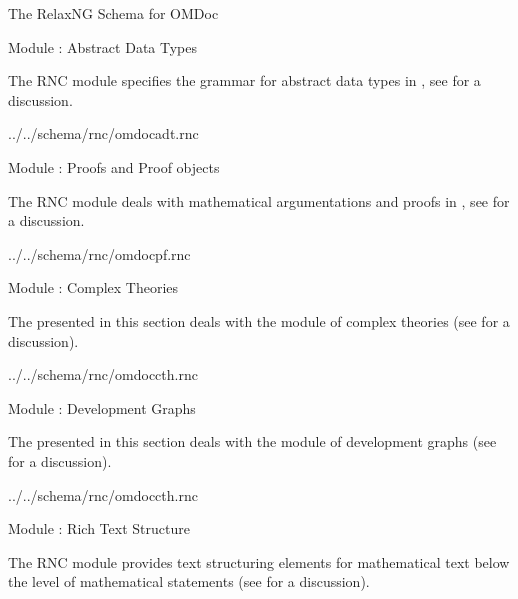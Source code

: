 \begin{tchapter}[id=rnc]{The RelaxNG Schema for OMDoc}
\begin{tsection}[id=rnc:adt]{Module {}: Abstract Data Types}

The RNC module {} specifies the grammar for abstract data types in 
{\omdoc}, see {} for a discussion.


{../../schema/rnc/omdocadt.rnc}
\end{tsection}

\begin{tsection}[id=rnc:proof]{Module {}: Proofs and Proof objects}

The RNC module {} deals with mathematical argumentations and proofs
in {\omdoc}, see {} for a discussion.


{../../schema/rnc/omdocpf.rnc}
\end{tsection}

\begin{tsection}[id=rnc:cth]{Module {}: Complex Theories}

  The {} presented in this section deals with the module
  {} of complex theories (see {} for a discussion).

 {../../schema/rnc/omdoccth.rnc}
\end{tsection}

\begin{tsection}[id=rnc:dg]{Module {}: Development Graphs}

  The {} presented in this section deals with the module
  {} of development graphs (see {} for a discussion).

 {../../schema/rnc/omdoccth.rnc}
\end{tsection}

\begin{tsection}[id=rnc:RT]{Module {}: Rich Text Structure}

  The RNC module {} provides text structuring elements for
  mathematical text below the level of mathematical statements (see
  {} for a discussion).


\end{tsection}
\end{tchapter}
